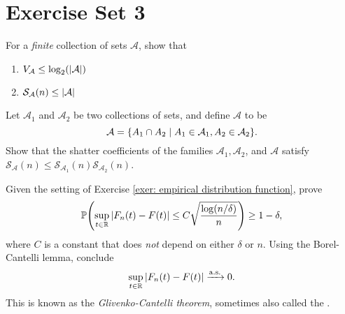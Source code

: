 \section{Exercise Set 3}

\begin{exercise}
For a \emph{finite} collection of sets $\mathcal{A}$, show that
\begin{enumerate}
    \item $V_{\mathcal{A}} \leq \log_2(\abs{\mathcal{A}})$

    \item $\mathcal{S}_{\mathcal{A}}(n) \leq \abs{\mathcal{A}}$
\end{enumerate}
\end{exercise}


\begin{exercise}
Let $\mathcal{A}_1$ and $\mathcal{A}_2$ be two collections of sets, and define $\mathcal{A}$ to be
\[
    \mathcal{A} = \set{A_1 \cap A_2 \with A_1 \in \mathcal{A}_1, A_2 \in \mathcal{A}_2}.
\]
Show that the shatter coefficients of the families $\mathcal{A}_1, \mathcal{A}_2$, and $\mathcal{A}$ satisfy $\mathcal{S}_{\mathcal{A}}(n) \leq \mathcal{S}_{\mathcal{A}_1}(n) \mathcal{S}_{\mathcal{A}_2}(n)$.
\end{exercise}


\begin{exercise}
Given the setting of Exercise \ref{exer: empirical distribution function}, prove
\[
    \P\left(\sup_{t \in \R} \abs{F_n(t) - F(t)} \leq C \sqrt{\frac{\log(n / \delta)}{n}}\right) \geq 1 - \delta,
\]
where $C$ is a constant that does \emph{not} depend on either $\delta$ or $n$. Using the Borel-Cantelli lemma, conclude
\[
    \sup_{t \in \mathbb{R}} \abs{F_n(t) - F(t)} \xrightarrow{\mathrm{a.s.}} 0.
\]
This is known as the \emph{Glivenko-Cantelli theorem}, sometimes also called the .
\end{exercise}
